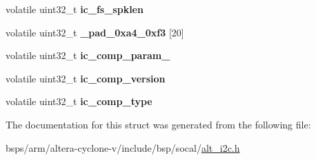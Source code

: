 \begin{DoxyCompactItemize}
volatile uint32\+\_\+t {\bfseries ic\+\_\+fs\+\_\+spklen}
\item 
\mbox{\label{structALT__I2C__raw__s_af2c07db9d4e7e4d76ce83b4c639c93e4}} 
volatile uint32\+\_\+t {\bfseries \+\_\+pad\+\_\+0xa4\+\_\+0xf3} \mbox{[}20\mbox{]}
\item 
\mbox{\label{structALT__I2C__raw__s_a4e149eca0ae33f21a7d768f2817590e9}} 
volatile uint32\+\_\+t {\bfseries ic\+\_\+comp\+\_\+param\+\_}
\item 
\mbox{\label{structALT__I2C__raw__s_a51a667455aa5144f6f5c94e4d4ee64b2}} 
volatile uint32\+\_\+t {\bfseries ic\+\_\+comp\+\_\+version}
\item 
\mbox{\label{structALT__I2C__raw__s_ad529f60482b9bced377a55d51f7de839}} 
volatile uint32\+\_\+t {\bfseries ic\+\_\+comp\+\_\+type}
\end{DoxyCompactItemize}


The documentation for this struct was generated from the following file\+:\begin{DoxyCompactItemize}
\item 
bsps/arm/altera-\/cyclone-\/v/include/bsp/socal/\mbox{\hyperlink{socal_2alt__i2c_8h}{alt\+\_\+i2c.\+h}}\end{DoxyCompactItemize}
